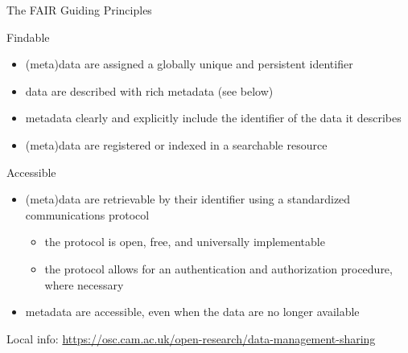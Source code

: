 \documentclass[ignorenonframetext,aspectratio=169,10pt,xcolor=table]{beamer}
\begin{document}
\begin{frame}{The FAIR Guiding Principles}
  \begin{block}{Findable}
    \begin{itemize}
    \item (meta)data are assigned a globally unique and persistent identifier
    \item data are described with rich metadata (see below)
    \item metadata clearly and explicitly include the identifier of the data it describes
    \item (meta)data are registered or indexed in a searchable resource
    \end{itemize}
  \end{block}

  \begin{block}{Accessible}
    \begin{itemize}
    \item (meta)data are retrievable by their identifier using a standardized communications protocol
      \begin{itemize}
      \item the protocol is open, free, and universally implementable
      \item the protocol allows for an authentication and authorization procedure, where necessary
      \end{itemize}
    \item metadata are accessible, even when the data are no longer available
    \end{itemize}
  \end{block}

  \begin{flushright}
    {\tiny
      Local info: \url{https://osc.cam.ac.uk/open-research/data-management-sharing}}
  \end{flushright}
\end{frame}
\end{document}
